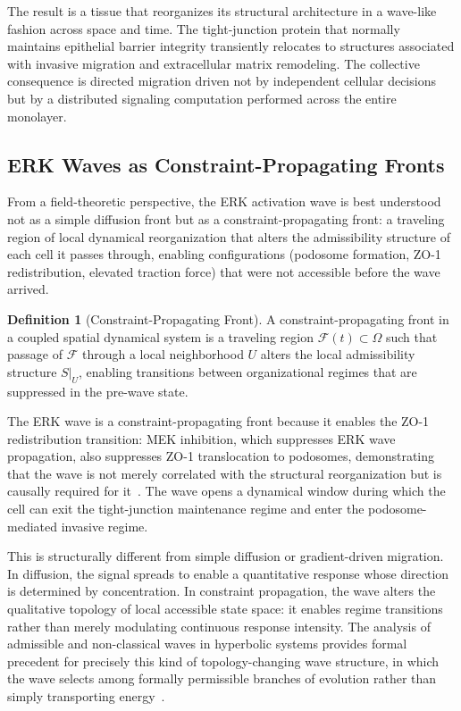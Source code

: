 \documentclass[11pt,a4paper]{article}
\theoremstyle{plain}
\theoremstyle{definition}
\newtheorem{definition}[theorem]{Definition}
\begin{document}
The result is a tissue that reorganizes its structural architecture in a wave-like fashion
across space and time. The tight-junction protein that normally maintains epithelial
barrier integrity transiently relocates to structures associated with invasive migration
and extracellular matrix remodeling. The collective consequence is directed migration
driven not by independent cellular decisions but by a distributed signaling computation
performed across the entire monolayer.

\subsection{ERK Waves as Constraint-Propagating Fronts}

From a field-theoretic perspective, the ERK activation wave is best understood not as a
simple diffusion front but as a constraint-propagating front: a traveling region of local
dynamical reorganization that alters the admissibility structure of each cell it passes
through, enabling configurations (podosome formation, ZO-1 redistribution, elevated
traction force) that were not accessible before the wave arrived.

\begin{definition}[Constraint-Propagating Front]
A constraint-propagating front in a coupled spatial dynamical system is a traveling
region $\mathcal{F}(t) \subset \Omega$ such that passage of $\mathcal{F}$ through a
local neighborhood $U$ alters the local admissibility structure $S|_U$, enabling
transitions between organizational regimes that are suppressed in the pre-wave state.
\end{definition}

The ERK wave is a constraint-propagating front because it enables the ZO-1 redistribution
transition: MEK inhibition, which suppresses ERK wave propagation, also suppresses ZO-1
translocation to podosomes, demonstrating that the wave is not merely correlated with
the structural reorganization but is causally required for it~\cite{Hirano2026}.
The wave opens a dynamical window during which the cell can exit the tight-junction
maintenance regime and enter the podosome-mediated invasive regime.

This is structurally different from simple diffusion or gradient-driven migration.
In diffusion, the signal spreads to enable a quantitative response whose direction is
determined by concentration. In constraint propagation, the wave alters the qualitative
topology of local accessible state space: it enables regime transitions rather than
merely modulating continuous response intensity. The analysis of admissible and
non-classical waves in hyperbolic systems provides formal precedent for precisely this
kind of topology-changing wave structure, in which the wave selects among formally
permissible branches of evolution rather than simply transporting energy~\cite{ElAbbassi2025}.
\end{document}

